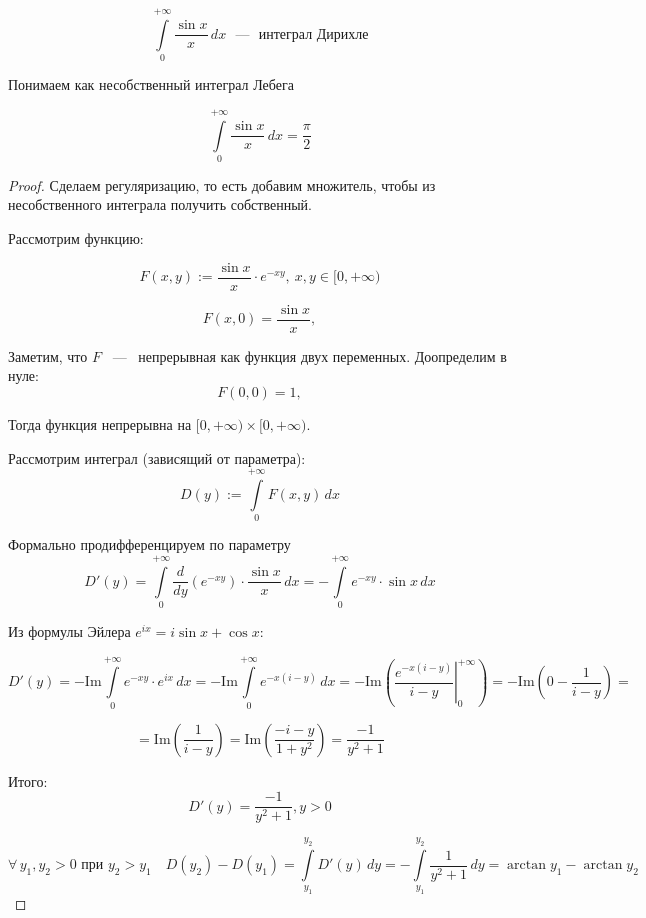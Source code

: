 \[
    \int\limits_0^{+\infty} \frac{\sin x}{x} \, dx \text{ ~---~ интеграл Дирихле}
\]

\begin{note}
Понимаем как несобственный интеграл Лебега
\end{note}

\begin{theorem}
\[
    \int\limits_0^{+\infty} \frac{\sin x}{x} \, dx = \frac{\pi}{2}
\]

\end{theorem}

\begin{proof}

\noindent Сделаем регуляризацию, то есть добавим множитель, чтобы из несобственного интеграла получить собственный.

\noindent Рассмотрим функцию:

\[
F(x, y) := \frac{\sin x}{x} \cdot e^{-x y}, \ x, y \in [0, +\infty)
\]

\[
F(x, 0) = \frac{\sin x}{x},
\]

\noindent Заметим, что $F$ ~---~ непрерывная как функция двух переменных. Доопределим в нуле:
\[
F(0, 0) = 1,
\]

\noindent Тогда функция непрерывна на $[0, +\infty) \times [0, +\infty)$.

Рассмотрим интеграл (зависящий от параметра):
\[
D(y) := \int\limits_0^{+\infty}F(x, y) \,d x
\]


\noindent Формально продифференцируем по параметру
\[
    D'(y) = \int\limits_0^{+\infty} \frac{d}{dy} \left( e^{-x y} \right) \cdot \frac{\sin x}{x} \, dx = - \int\limits_0^{+\infty} e^{-x y} \cdot \sin x \, dx
\]

\noindent Из формулы Эйлера $e^{ix} = i \sin x + \cos x$:

\[
D'(y) = -\mathrm{Im} \int\limits_0^{+\infty} e^{-xy} \cdot e^{ix} \, dx
= -\mathrm{Im} \int\limits_0^{+\infty} e^{-x(i - y)}\, dx
= -\mathrm{Im} \left( \left. \frac{e^{-x(i - y)}}{i - y} \right|_0^{+\infty} \right) = -\mathrm{Im}\left( 0 - \frac{1}{i-y}\right) =
\]

\[
= \mathrm{Im} \left( \frac{1}{i - y} \right) = \mathrm{Im} \left( \frac{-i - y}{1 + y^2} \right)
= \frac{-1}{y^2 + 1}
\]

\noindent Итого:
\[
D'(y) = \frac{-1}{y^2 + 1}, y > 0
\]

\[
\forall\, y_1, y_2 > 0 \text{ при } y_2 > y_1 \quad
D(y_2) - D(y_1) = \int\limits_{y_1}^{y_2} D'(y) \, dy
= - \int\limits_{y_1}^{y_2} \frac{1}{y^2 + 1} \, dy = \arctan{y_1} - \arctan{y_2}
\]


\end{proof}
